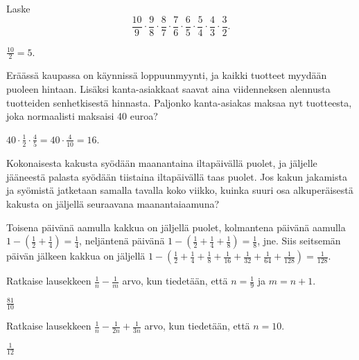 \begin{tehtavasivu}
\begin{tehtava}
    Laske 
    \[ \frac{10}{9}\cdot \frac{9}{8}\cdot \frac{8}{7}\cdot \frac{7}{6}\cdot \frac{6}{5}
    \cdot \frac{5}{4}\cdot \frac{4}{3}\cdot \frac{3}{2}. \]
    \begin{vastaus}
		$\frac{10}{2}=5$.
    \end{vastaus}        
\end{tehtava}
    
\begin{tehtava}
	Eräässä kaupassa on käynnissä loppuunmyynti, ja kaikki tuotteet
    myydään puoleen hintaan. Lisäksi kanta-asiakkaat saavat aina
    viidenneksen alennusta tuotteiden senhetkisestä hinnasta.
	Paljonko kanta-asiakas maksaa nyt tuotteesta, joka normaalisti
    maksaisi 40 euroa?
    \begin{vastaus}
		$40\cdot \frac{1}{2} \cdot \frac{4}{5}=40\cdot \frac{4}{10}= 16$. 
	\end{vastaus}
\end{tehtava}
    
\begin{tehtava}
	Kokonaisesta kakusta syödään maanantaina iltapäivällä puolet, ja jäljelle
	jääneestä palasta syödään tiistaina iltapäivällä taas puolet.
	Jos kakun jakamista ja syömistä jatketaan samalla tavalla koko viikko,
	kuinka suuri osa alkuperäisestä kakusta on
	jäljellä seuraavana maanantaiaamuna?
	\begin{vastaus}
		Toisena päivänä aamulla kakkua on jäljellä puolet, kolmantena
		päivänä aamulla
		$1-\left(\frac{1}{2} + \frac{1}{4}\right) = \frac{1}{4}$, 
		neljäntenä päivänä
		$1-\left(\frac{1}{2} + \frac{1}{4} + \frac{1}{8}\right)
		= \frac{1}{8}$, jne.
		Siis seitsemän päivän jälkeen kakkua on jäljellä
		$1-\left(\frac{1}{2} + \frac{1}{4} + \frac{1}{8} +
		\frac{1}{16} + \frac{1}{32} + \frac{1}{64} + \frac{1}{128}\right)
		= \frac{1}{128}$.  
	\end{vastaus}
\end{tehtava}

\begin{tehtava}
	Ratkaise lausekkeen $\frac{1}{n}-\frac{1}{m}$ arvo, kun tiedetään, että $n = \frac{1}{9}$ ja $m=n+1$.
	\begin{vastaus}
		$\frac{81}{10}$
	\end{vastaus}
\end{tehtava}

\begin{tehtava}
	Ratkaise lausekkeen $\frac{1}{n}-\frac{1}{2n}+\frac{1}{3n}$ arvo, kun tiedetään, että $n = 10$.
	\begin{vastaus}
		$\frac{1}{12}$
	\end{vastaus}
\end{tehtava}


\end{tehtavasivu}
